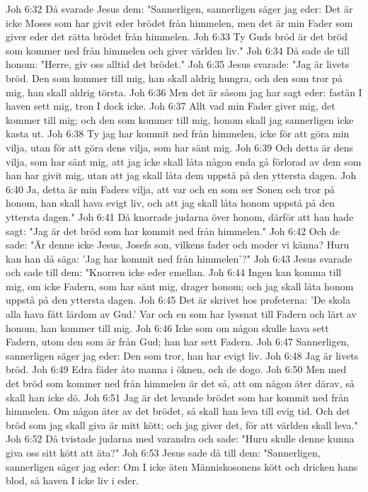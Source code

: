 Joh 6:32  Då svarade Jesus dem: "Sannerligen, sannerligen säger jag eder: Det är icke Moses som har givit eder brödet från himmelen, men det är min Fader som giver eder det rätta brödet från himmelen.
Joh 6:33  Ty Guds bröd är det bröd som kommer ned från himmelen och giver världen liv."
Joh 6:34  Då sade de till honom: "Herre, giv oss alltid det brödet."
Joh 6:35  Jesus svarade: "Jag är livets bröd. Den som kommer till mig, han skall aldrig hungra, och den som tror på mig, han skall aldrig törsta.
Joh 6:36  Men det är såsom jag har sagt eder: fastän I haven sett mig, tron I dock icke.
Joh 6:37  Allt vad min Fader giver mig, det kommer till mig; och den som kommer till mig, honom skall jag sannerligen icke kasta ut.
Joh 6:38  Ty jag har kommit ned från himmelen, icke för att göra min vilja, utan för att göra dens vilja, som har sänt mig.
Joh 6:39  Och detta är dens vilja, som har sänt mig, att jag icke skall låta någon enda gå förlorad av dem som han har givit mig, utan att jag skall låta dem uppstå på den yttersta dagen.
Joh 6:40  Ja, detta är min Faders vilja, att var och en som ser Sonen och tror på honom, han skall hava evigt liv, och att jag skall låta honom uppstå på den yttersta dagen."
Joh 6:41  Då knorrade judarna över honom, därför att han hade sagt: "Jag är det bröd som har kommit ned från himmelen."
Joh 6:42  Och de sade: "Är denne icke Jesus, Josefs son, vilkens fader och moder vi känna? Huru kan han då säga: 'Jag har kommit ned från himmelen'?"
Joh 6:43  Jesus svarade och sade till dem: "Knorren icke eder emellan.
Joh 6:44  Ingen kan komma till mig, om icke Fadern, som har sänt mig, drager honom; och jag skall låta honom uppstå på den yttersta dagen.
Joh 6:45  Det är skrivet hos profeterna: 'De skola alla hava fått lärdom av Gud.' Var och en som har lyssnat till Fadern och lärt av honom, han kommer till mig.
Joh 6:46  Icke som om någon skulle hava sett Fadern, utom den som är från Gud; han har sett Fadern.
Joh 6:47  Sannerligen, sannerligen säger jag eder: Den som tror, han har evigt liv.
Joh 6:48  Jag är livets bröd.
Joh 6:49  Edra fäder åto manna i öknen, och de dogo.
Joh 6:50  Men med det bröd som kommer ned från himmelen är det så, att om någon äter därav, så skall han icke dö.
Joh 6:51  Jag är det levande brödet som har kommit ned från himmelen. Om någon äter av det brödet, så skall han leva till evig tid. Och det bröd som jag skall giva är mitt kött; och jag giver det, för att världen skall leva."
Joh 6:52  Då tvistade judarna med varandra och sade: "Huru skulle denne kunna giva oss sitt kött att äta?"
Joh 6:53  Jesus sade då till dem: "Sannerligen, sannerligen säger jag eder: Om I icke äten Människosonens kött och dricken hans blod, så haven I icke liv i eder.
